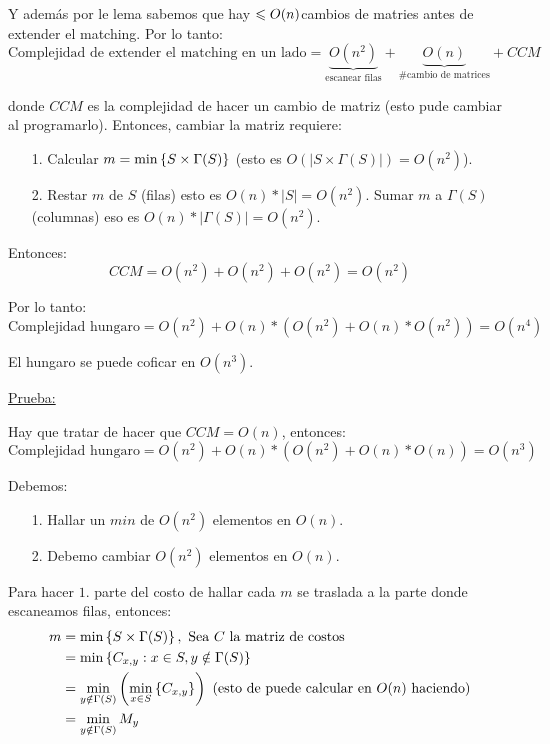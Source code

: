 \documentclass[12pt,a4paper]{article}
\begin{document}
Y además por le lema sabemos que hay $\leqslant O(n)$cambios de matries antes de extender 
el matching. Por lo tanto:
$$\text{Complejidad de extender el matching en un lado} = \underbrace{O(n^{2})}_{\text{escanear filas}} + \underbrace{O(n)}_{\text{\# cambio de matrices}} + CCM$$

donde $CCM$ es la complejidad de hacer un cambio de matriz (esto pude cambiar al programarlo).
Entonces, cambiar la matriz requiere:
\medskip

\begin{itemize}
    \item [1.] Calcular $m = \min \left\lbrace S \times \Gamma(S) \right\rbrace$ (esto es $O(|S \times \Gamma(S)|)=O(n^2)$).
    \item [2.] Restar $m$ de $S$ (filas) esto es $O(n)*|S| = O(n^2)$. Sumar $m$ a $\Gamma(S)$ (columnas) 
        eso es $O(n)*|\Gamma(S)| = O(n^2)$.
\end{itemize}
Entonces:
$$CCM = O(n^2) + O(n^2) + O(n^2) = O(n^2)$$

Por lo tanto:
$$\text{Complejidad hungaro} = O(n^{2}) + O(n)*(O(n^{2}) + O(n)*O(n^{2})) = O(n^{4})$$

\begin{teorema} El hungaro se puede coficar en $O(n^3)$.
\end{teorema}
\underline{Prueba:}
\medskip

Hay que tratar de hacer que $CCM = O(n)$, entonces:
$$\text{Complejidad hungaro} = O(n^{2}) + O(n)*(O(n^{2}) + O(n)*O(n)) = O(n^{3})$$

Debemos:
\begin{itemize}
    \item [1.] Hallar un $min$ de $O(n^{2})$ elementos en $O(n)$.
    \item [2.] Debemo cambiar $O(n^{2})$ elementos en $O(n)$.
\end{itemize}

Para hacer $1.$ parte del costo de hallar cada $m$ se traslada a la parte donde 
escaneamos filas, entonces:
\begin{align*}
    m &= \min \left\lbrace S \times \Gamma(S) \right\rbrace,\,\, \text{Sea $C$ la matriz de costos} \\
    &= \min \left\lbrace C_{x,y} : x \in S, y \notin \Gamma(S) \right\rbrace \\
    &= \min_{y\notin \Gamma(S)} \left(\min_{x\in S}\left\lbrace C_{x,y} \right\rbrace\right)\,\,(\text{esto de puede calcular en $O(n)$ haciendo})\\
    &= \min_{y \notin \Gamma(S)} M_{y} 
\end{align*}
\end{document}
